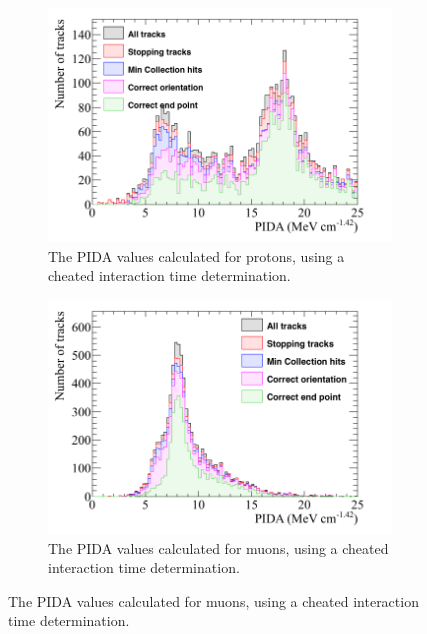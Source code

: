 \begin{figure}
\begin{subfigure}{0.48\textwidth}
        \label{fig:CRY_PIDACheat_Muon_NonCheat}
  \end{subfigure}
  \begin{subfigure}{0.48\textwidth}
        \centering
        \includegraphics[width=\textwidth]{ProtonEnrich_500V_v05_14_00_trackpmtrackdc_MinTrCut_MCCont_Proton_PIDA}
        \caption{The PIDA values calculated for protons, using a cheated interaction time determination.}
        \label{fig:CRY_PIDACheat_Proton_Cheat}
  \end{subfigure}%
  \hspace{0.03\textwidth}%
  \begin{subfigure}{0.48\textwidth}
        \centering
        \includegraphics[width=\textwidth]{ProtonEnrich_500V_v05_14_00_trackpmtrackdc_MinTrCut_MCCont_Muon_PIDA}
        \caption{The PIDA values calculated for muons, using a cheated interaction time determination.}

\end{subfigure}
\end{figure}
